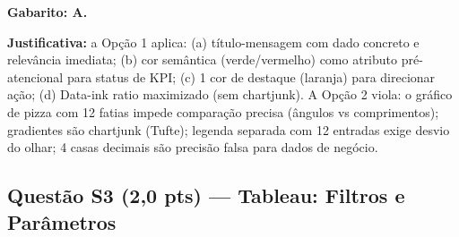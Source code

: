 \begin{SolvedBox}
\medskip
\textbf{Gabarito: A.}

\textbf{Justificativa:} a Opção 1 aplica: (a) título-mensagem com dado concreto e
relevância imediata; (b) cor semântica (verde/vermelho) como atributo pré-atencional
para status de KPI; (c) 1 cor de destaque (laranja) para direcionar ação; (d) Data-ink
ratio maximizado (sem chartjunk). A Opção 2 viola: o gráfico de pizza com 12 fatias
impede comparação precisa (ângulos vs comprimentos); gradientes são chartjunk (Tufte);
legenda separada com 12 entradas exige desvio do olhar; 4 casas decimais são precisão
falsa para dados de negócio.
\end{SolvedBox}

\subsection*{Questão S3 (2,0 pts) — Tableau: Filtros e Parâmetros}

